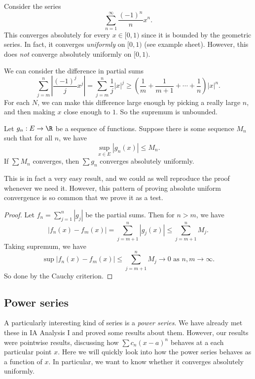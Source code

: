 \documentclass[a4paper]{article}
\begin{document}
\begin{eg}
  Consider the series
  \[
    \sum_{n = 1}^\infty \frac{(-1)^n}{n}x^n.
  \]
  This converges absolutely for every $x\in [0, 1)$ since it is bounded by the geometric series. In fact, it converges \emph{uniformly} on $[0, 1)$ (see example sheet). However, this does \emph{not} converge absolutely uniformly on $[0, 1)$.

  We can consider the difference in partial sums
  \[
    \sum_{j = m}^n \left|\frac{(-1)^j}{j}x^j\right| = \sum_{j = m}^n \frac{1}{j}|x|^j \geq \left(\frac{1}{m} + \frac{1}{m + 1} + \cdots + \frac{1}{n}\right)|x|^n.
  \]
  For each $N$, we can make this difference large enough by picking a really large $n$, and then making $x$ close enough to $1$. So the supremum is unbounded.
\end{eg}

\begin{thm}
  Let $g_n: E \to \R$ be a sequence of functions. Suppose there is some sequence $M_n$ such that for all $n$, we have
  \[
    \sup_{x\in E}|g_n (x)| \leq M_n.
  \]
  If $\sum M_n$ converges, then $\sum g_n$ converges absolutely uniformly.
\end{thm}
This is in fact a very easy result, and we could as well reproduce the proof whenever we need it. However, this pattern of proving absolute uniform convergence is so common that we prove it as a test.

\begin{proof}
  Let $f_n = \sum\limits_{j = 1}^n |g_j|$ be the partial sums. Then for $n > m$, we have
  \[
    |f_n(x) - f_m(x)| = \sum_{j = m + 1}^n |g_j(x)| \leq \sum_{j = m + 1}^n M_j.
  \]
  Taking supremum, we have
  \[
    \sup|f_n(x) - f_m(x)| \leq \sum_{j = m + 1}^n M_j \to 0\text{ as }n, m\to \infty.
  \]
  So done by the Cauchy criterion.
\end{proof}

\subsection{Power series}
A particularly interesting kind of series is a \emph{power series}. We have already met these in IA Analysis I and proved some results about them. However, our results were pointwise results, discussing how $\sum c_n (x - a)^n$ behaves at a each particular point $x$. Here we will quickly look into how the power series behaves as a function of $x$. In particular, we want to know whether it converges absolutely uniformly.
\end{document}
